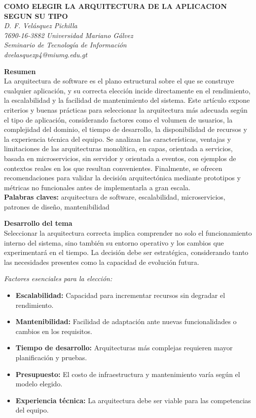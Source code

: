 \documentclass[12pt,letterpaper]{article}
\begin{document}
\begin{center}
\textbf{\uppercase{Como elegir la arquitectura de la aplicacion segun su tipo}}\\[10pt]
\textit{D. F. Velásquez Pichilla}\\
\textit{7690-16-3882 Universidad Mariano Gálvez}\\
\textit{Seminario de Tecnología de Información}\\
\textit{dvelasquezp4@miumg.edu.gt}
\end{center}

\textbf{Resumen}\\
La arquitectura de software es el plano estructural sobre el que se construye cualquier aplicación, y su correcta elección incide directamente en el rendimiento, la escalabilidad y la facilidad de mantenimiento del sistema. Este artículo expone criterios y buenas prácticas para seleccionar la arquitectura más adecuada según el tipo de aplicación, considerando factores como el volumen de usuarios, la complejidad del dominio, el tiempo de desarrollo, la disponibilidad de recursos y la experiencia técnica del equipo. Se analizan las características, ventajas y limitaciones de las arquitecturas monolítica, en capas, orientada a servicios, basada en microservicios, sin servidor y orientada a eventos, con ejemplos de contextos reales en los que resultan convenientes. Finalmente, se ofrecen recomendaciones para validar la decisión arquitectónica mediante prototipos y métricas no funcionales antes de implementarla a gran escala.\\[8pt]

\textbf{Palabras claves:} arquitectura de software, escalabilidad, microservicios, patrones de diseño, mantenibilidad

\textbf{Desarrollo del tema}\\
Seleccionar la arquitectura correcta implica comprender no solo el funcionamiento interno del sistema, sino también su entorno operativo y los cambios que experimentará en el tiempo. La decisión debe ser estratégica, considerando tanto las necesidades presentes como la capacidad de evolución futura.

\textit{Factores esenciales para la elección:}
\begin{itemize}
    \item \textbf{Escalabilidad:} Capacidad para incrementar recursos sin degradar el rendimiento.
    \item \textbf{Mantenibilidad:} Facilidad de adaptación ante nuevas funcionalidades o cambios en los requisitos.
    \item \textbf{Tiempo de desarrollo:} Arquitecturas más complejas requieren mayor planificación y pruebas.
    \item \textbf{Presupuesto:} El costo de infraestructura y mantenimiento varía según el modelo elegido.
    \item \textbf{Experiencia técnica:} La arquitectura debe ser viable para las competencias del equipo.
\end{itemize}
\end{document}
